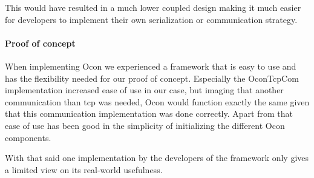 \documentclass[../report.tex]{subfiles}
\begin{document}
This would have resulted in a much lower coupled design making it much easier for developers to implement their own serialization or communication strategy.

\paragraph{Proof of concept}
When implementing Ocon we experienced a framework that is easy to use and has the flexibility needed for our proof of concept. Especially the OconTcpCom implementation increased ease of use in our case, but imaging that another communication than tcp was needed, Ocon would function exactly the same given that this communication implementation was done correctly. Apart from that ease of use has been good in the simplicity of initializing the different Ocon components.

With that said one implementation by the developers of the framework only gives a limited view on its real-world usefulness.
\end{document}
